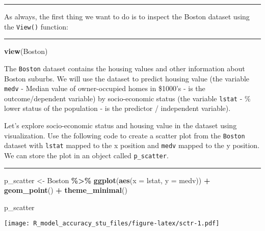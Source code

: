 \documentclass[
  12pt,
]{article}
\newenvironment{Shaded}{\begin{snugshade}}{\end{snugshade}}
\newcommand{\AttributeTok}[1]{\textcolor[rgb]{0.13,0.29,0.53}{#1}}
\newcommand{\FunctionTok}[1]{\textcolor[rgb]{0.13,0.29,0.53}{\textbf{#1}}}
\newcommand{\NormalTok}[1]{#1}
\newcommand{\OtherTok}[1]{\textcolor[rgb]{0.56,0.35,0.01}{#1}}
\newcommand{\SpecialCharTok}[1]{\textcolor[rgb]{0.81,0.36,0.00}{\textbf{#1}}}
\begin{document}
\begin{center}\rule{0.5\linewidth}{0.5pt}\end{center}

As always, the first thing we want to do is to inspect the Boston
dataset using the \texttt{View()} function:

\begin{center}\rule{0.5\linewidth}{0.5pt}\end{center}

\begin{Shaded}
\begin{Highlighting}[]
\FunctionTok{view}\NormalTok{(Boston)}
\end{Highlighting}
\end{Shaded}

The \texttt{Boston} dataset contains the housing values and other
information about Boston suburbs. We will use the dataset to predict
housing value (the variable \texttt{medv} - Median value of
owner-occupied homes in \$1000's - is the outcome/dependent variable) by
socio-economic status (the variable \texttt{lstat} - \% lower status of
the population - is the predictor / independent variable).

Let's explore socio-economic status and housing value in the dataset
using visualization. Use the following code to create a scatter plot
from the \texttt{Boston} dataset with \texttt{lstat} mapped to the x
position and \texttt{medv} mapped to the y position. We can store the
plot in an object called \texttt{p\_scatter}.

\begin{center}\rule{0.5\linewidth}{0.5pt}\end{center}

\begin{Shaded}
\begin{Highlighting}[]
\NormalTok{p\_scatter }\OtherTok{\textless{}{-}} 
\NormalTok{  Boston }\SpecialCharTok{\%\textgreater{}\%} 
  \FunctionTok{ggplot}\NormalTok{(}\FunctionTok{aes}\NormalTok{(}\AttributeTok{x =}\NormalTok{ lstat, }\AttributeTok{y =}\NormalTok{ medv)) }\SpecialCharTok{+}
  \FunctionTok{geom\_point}\NormalTok{() }\SpecialCharTok{+}
  \FunctionTok{theme\_minimal}\NormalTok{()}

\NormalTok{p\_scatter}
\end{Highlighting}
\end{Shaded}

\texttt{[image: R\_model\_accuracy\_stu\_files/figure-latex/sctr-1.pdf]}
\end{document}
